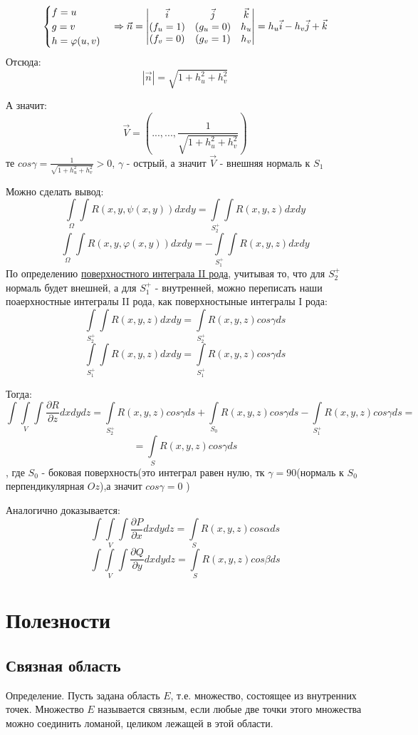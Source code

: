 \documentclass{article}
\begin{document}
$$
\begin{cases}
   f = u \\
   g = v \\
   h = \varphi(u,v)
\end{cases}
\Rightarrow
\vec{n} = 
\begin{vmatrix}
\vec{i} & \vec{j} & \vec{k} \\
(f_u = 1) & (g_u = 0) & h_u \\
(f_v = 0) & (g_v = 1) & h_v 
\end{vmatrix}
=
\-h_u \vec{i} - h_v \vec{j} + \vec{k}
$$
Отсюда:
$$
|\vec{n}| = \sqrt{1+h_u^2 + h_v^2}
$$

А значит:
$$
\vec{V} = ( ..., ... , \frac{1}{\sqrt{1+h_u^2 + h_v^2}})
$$
те $cos\gamma = \frac{1}{\sqrt{1+h_u^2 + h_v^2}} > 0$, $\gamma$ - острый, а значит $\vec{V}$ - внешняя нормаль к $S_1$

Можно сделать вывод:
$$
\int\limits_{\Omega}\int R(x,y,\psi(x,y))dxdy = \int\limits_{S_2^+}\int R(x,y,z)dxdy
$$
$$
\int\limits_{\Omega}\int R(x,y,\varphi(x,y))dxdy = -\int\limits_{S_1^+}\int R(x,y,z)dxdy
$$
По определению \hyperref[eq9]{поверхностного интеграла II рода}, учитывая то, что для $S_2^+$
нормаль будет внешней, а для $S_1^+$ - внутренней, можно переписать наши поаерхностные интегралы II рода,
как поверхностыные интегралы I рода:
	$$\int\limits_{S_2^+}\int R(x,y,z)dxdy = \int\limits_{S_2^+} R(x,y,z)cos\gamma ds$$
	$$\int\limits_{S_1^+}\int R(x,y,z)dxdy = \int\limits_{S_1^+} R(x,y,z)cos\gamma ds$$

Тогда:
$$
\int\int\limits_{V}\int \frac{\partial R}{\partial z}dxdydz = \int\limits_{S_2^+} R(x,y,z)cos\gamma ds + 
\int\limits_{S_0} R(x,y,z)cos\gamma ds - \int\limits_{S_1^+} R(x,y,z)cos\gamma ds =
$$
$$
=
\int\limits_{S} R(x,y,z)cos\gamma ds 
$$
, где $S_0$ - боковая поверхность(это интеграл равен нулю, тк $\gamma = 90$(нормаль к $S_0$ перпендикулярная $Oz$),а значит $cos\gamma = 0$ )

Аналогично доказывается:
$$
\int\int\limits_{V}\int \frac{\partial P}{\partial x}dxdydz = \int\limits_{S} R(x,y,z)cos\alpha ds 
$$
$$
\int\int\limits_{V}\int \frac{\partial Q}{\partial y}dxdydz = \int\limits_{S} R(x,y,z)cos\beta ds 
$$
\newpage
\section{Полезности}
\subsection*{Связная область}\label{eq4}
Определение. Пусть задана область $E$, т.е. множество, состоящее из внутренних точек. Множество $E$ называется связным, если любые две точки этого
множества можно соединить ломаной, целиком лежащей в этой области.
\end{document}
